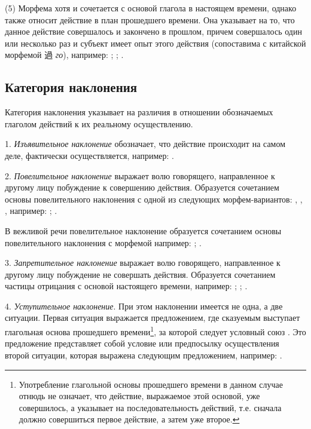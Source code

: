 (5)	Морфема  хотя и сочетается с основой глагола в настоящем времени, однако также относит действие в план прошедшего времени. Она указывает на то, что данное действие совершалось и закончено в прошлом, причем совершалось один или несколько раз и субъект имеет опыт этого
действия (сопоставима с китайской морфемой {\chinfont 過} \emph{го}), например:
;
;
.

\subsection{Категория наклонения}

Категория наклонения указывает на различия в отношении обозначаемых глаголом действий к их реальному осуществлению.

1. \emph{Изъявительное наклонение} обозначает, что действие происходит на самом деле, фактически осуществляется, например:
.

2. \emph{Повелительное наклонение} выражает волю говорящего, направленное к другому лицу побуждение к совершению действия. Образуется сочетанием основы повелительного наклонения с одной из следующих морфем-вариантов:
, , , например:
;
.

В вежливой речи повелительное наклонение образуется сочетанием основы повелительного наклонения с морфемой  например:
;
.

3. \emph{Запретительное наклонение} выражает волю говорящего, направленное к другому лицу побуждение не совершать действия. Образуется сочетанием частицы отрицания с основой настоящего времени, например:
;
;
.

4. \emph{Уступительное наклонение}. При этом наклонении имеется не одна, а две ситуации. Первая ситуация выражается предложением, где сказуемым выступает глагольная основа прошедшего времени\footnote[39]{Употребление глагольной основы прошедшего времени в данном случае отнюдь не означает, что действие, выражаемое этой основой, уже совершилось, а указывает на последовательность действий, т.е. сначала должно совершиться первое действие, а затем уже второе.}, за которой следует условный союз . Это предложение представляет собой условие или предпосылку осуществления второй ситуации, которая выражена следующим предложением, например:
.

